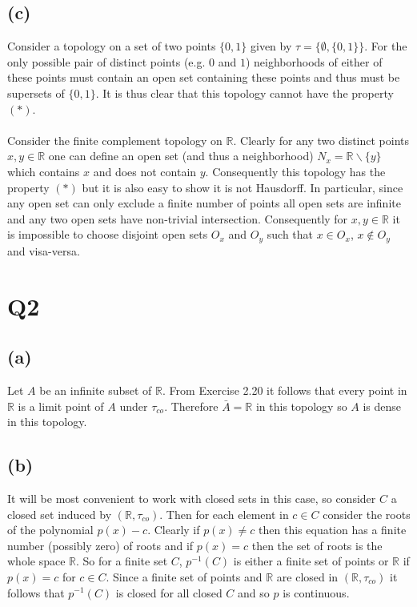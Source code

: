 \documentclass{article}
\begin{document}
\subsection*{(c)}
Consider a topology on a set of two points $\{0,1\}$ given by $\tau = \{\emptyset,\{0,1\}\}$. For 
the only possible pair of distinct points (e.g. $0$ and $1$) neighborhoods of either of these 
points must contain an open set containing these points and thus must be supersets of 
$\{0,1\}$. It is thus clear that this topology cannot have the property $(*)$.

\paragraph{}
Consider the finite complement topology on $\mathbb{R}$. Clearly for any two distinct points 
$x,y \in \mathbb{R}$ one can define an open set (and thus a neighborhood) $N_x = \mathbb{R}\backslash \{y\}$ 
which contains $x$ and does not contain $y$. Consequently this topology has the property $(*)$ 
but it is also easy to show it is not Hausdorff. In particular, since any open set can only exclude a 
finite number of points all open sets are infinite and any two open sets have non-trivial intersection. 
Consequently for $x,y \in \mathbb{R}$ it is impossible to choose disjoint open sets $O_x$ and $O_y$ 
such that $x \in O_x$, $x \notin O_y$ and visa-versa.


\section*{Q2}

\subsection*{(a)}
Let $A$ be an infinite subset of $\mathbb{R}$. From Exercise 2.20 it follows that every point in 
$\mathbb{R}$ is a limit point of $A$ under $\tau_{co}$. Therefore $\bar{A} = \mathbb{R}$ 
in this topology so $A$ is dense in this topology.

\subsection*{(b)}
It will be most convenient to work with closed sets in this case, so consider $C$ a closed 
set induced by $(\mathbb{R},\tau_{co})$. Then for each element in $c \in C$ consider the roots 
of the polynomial $p(x) -c$. Clearly if $p(x) \neq c$ then this equation has a finite number (possibly zero) 
of roots and if $p(x) = c$ then the set of roots is the whole space $\mathbb{R}$. So for a 
finite set $C$, $p^{-1}(C)$ is either a finite set of points or $\mathbb{R}$ if $p(x) = c$ for 
$c \in C$. Since a finite set of points and $\mathbb{R}$ are closed in $(\mathbb{R},\tau_{co})$ 
it follows that $p^{-1}(C)$ is closed for all closed $C$ and so $p$ is continuous.
\end{document}
